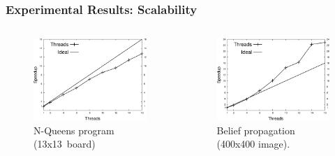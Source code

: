 \documentclass{beamer}
\begin{document}
\begin{frame}[fragile]
   \frametitle{Experimental Results: Scalability}
   \begin{columns}[t]
      \begin{figure}[b]
         \includegraphics[width=\textwidth]{../speedup_8queens-13.pdf}
         \caption{N-Queens program (13x13~board)}
      \end{figure}
      \begin{figure}[b]
         \includegraphics[width=\textwidth]{../speedup_bp-400.pdf}
         \caption{Belief propagation (400x400 image).}
      \end{figure}
   \end{columns}
\end{frame}
\end{document}
